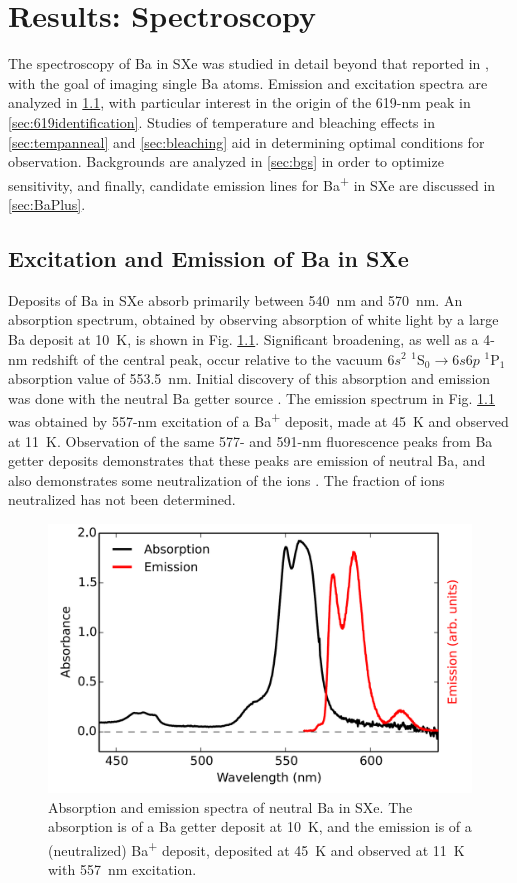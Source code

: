 \chapter{Results: Spectroscopy}

The spectroscopy of Ba in SXe was studied in detail beyond that reported in \cite{Shon,Brian}, with the goal of imaging single Ba atoms.  Emission and excitation spectra are analyzed in \ref{sec:fluorescence}, with particular interest in the origin of the 619-nm peak in \ref{sec:619identification}.  Studies of temperature and bleaching effects in \ref{sec:tempanneal} and \ref{sec:bleaching} aid in determining optimal conditions for observation.  Backgrounds are analyzed in \ref{sec:bgs} in order to optimize sensitivity, and finally, candidate emission lines for Ba\textsuperscript{+} in SXe are discussed in \ref{sec:BaPlus}.

\section{Excitation and Emission of Ba in SXe}
\label{sec:fluorescence}

Deposits of Ba in SXe absorb primarily between 540~nm and 570~nm.  An absorption spectrum, obtained by observing absorption of white light by a large Ba deposit at 10~K, is shown in Fig. \ref{fig:BaAbs}.  Significant broadening, as well as a 4-nm redshift  of the central peak, occur relative to the vacuum $6s^{2}$ $^{1}$S$_{0} \rightarrow 6s6p$ $^{1}$P$_{1}$ absorption value of 553.5~nm.  Initial discovery of this absorption and emission was done with the neutral Ba getter source \cite{Mong2015,Shon,Brian}.  The emission spectrum in Fig. \ref{fig:BaAbs} was obtained by 557-nm excitation of a Ba\textsuperscript{+} deposit, made at 45~K and observed at 11~K.  Observation of the same 577- and 591-nm fluorescence peaks from Ba getter deposits demonstrates that these peaks are emission of neutral Ba, and also demonstrates some neutralization of the ions \cite{Mong2015,Shon,Brian}.  The fraction of ions neutralized has not been determined.

\begin{figure} %
        \centering
                \includegraphics[width=.7\textwidth]{figures/BaAbs_fromBaSpec.png}
                \caption{Absorption and emission spectra of neutral Ba in SXe.  The absorption is of a Ba getter deposit at 10~K, and the emission is of a (neutralized) Ba\textsuperscript{+} deposit, deposited at 45~K and observed at 11~K with 557~nm excitation.\cite{Mong2015}}
\label{fig:BaAbs}
\end{figure}


